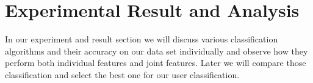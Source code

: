 \documentclass{standalone}
\begin{document}
\chapter{Experimental Result and Analysis}
In our experiment and result section we will discuss various classification algorithms and their accuracy on our data set individually and observe how they perform both individual features and joint features. Later we will compare those classification and select the best one for our user classification.
\end{document}
